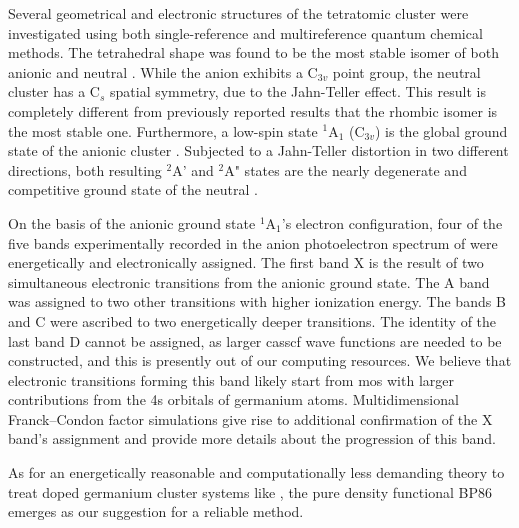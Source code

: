 \begin{refsection}
Several geometrical and electronic structures of the tetratomic cluster  were investigated using both single-reference and multireference quantum chemical methods. The tetrahedral shape was found to be the most stable isomer of both anionic and neutral . While the anion exhibits a C$_{3v}$ point group, the neutral cluster has a C$_s$ spatial symmetry, due to the Jahn-Teller effect. This result is completely different from previously reported results that the rhombic isomer is the most stable one. Furthermore, a low-spin state $^1$A$_1$ (C$_{3v}$) is the global ground state of the anionic cluster . Subjected to a Jahn-Teller distortion in two different directions, both resulting $^2$A' and $^2$A" states are the nearly degenerate and competitive ground state of the neutral .





On the basis of the anionic ground state $^1$A$_1$'s electron configuration, four of the five bands experimentally recorded in the anion photoelectron spectrum of  were energetically and electronically assigned. The first band X is the result of two simultaneous electronic transitions from the anionic ground state. The A band was assigned to two other transitions with higher ionization energy. The bands B and C were ascribed to two energetically deeper transitions. The identity of the last band D cannot be assigned, as larger \acrshort{casscf} wave functions are needed to be constructed, and this is presently out of our computing resources. We believe that electronic transitions forming this band likely start from \acrshort{mo}s with larger contributions from the 4s orbitals of germanium atoms. Multidimensional Franck–Condon factor simulations give rise to additional confirmation of the X band's assignment and provide more details about the progression of this band.





As for an energetically reasonable and computationally less demanding theory to treat doped germanium cluster systems like , the pure density functional BP86 emerges as our suggestion for a reliable method.














\printbibliography[heading=subbibliography] %

\end{refsection}






